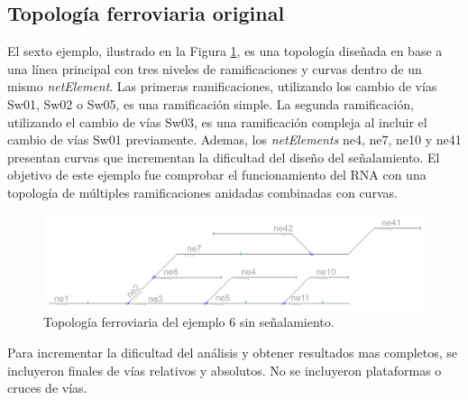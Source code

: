 \subsection{Topología ferroviaria original}

	El sexto ejemplo, ilustrado en la Figura \ref{fig:EJ6_1}, es una topología diseñada en base a una línea principal con tres niveles de ramificaciones y curvas dentro de un mismo \textit{netElement}. Las primeras ramificaciones, utilizando los cambio de vías Sw01, Sw02 o Sw05, es una ramificación simple. La segunda ramificación, utilizando el cambio de vías Sw03, es una ramificación compleja al incluir el cambio de vías Sw01 previamente. Ademas, los \textit{netElements} ne4, ne7, ne10 y ne41 presentan curvas que incrementan la dificultad del diseño del señalamiento. El objetivo de este ejemplo fue comprobar el funcionamiento del RNA con una topología de múltiples ramificaciones anidadas combinadas con curvas.
	
	\begin{figure}[h]
		\centering
		\includegraphics[width=1\textwidth]{resultados-obtenidos/ejemplo6/images/6_empty.png}
		\centering\caption{Topología ferroviaria del ejemplo 6 sin señalamiento.}
		\label{fig:EJ6_1}
	\end{figure}
	
	Para incrementar la dificultad del análisis y obtener resultados mas completos, se incluyeron finales de vías relativos y absolutos. No se incluyeron plataformas o cruces de vías.
